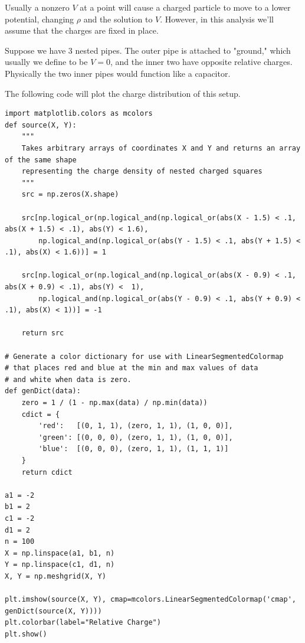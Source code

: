 Usually a nonzero $V$ at a point will cause a charged particle to move to a lower potential, changing $\rho$ and the solution to $V$.
However, in this analysis we'll assume that the charges are fixed in place.

Suppose we have 3 nested pipes.
The outer pipe is attached to "ground," which usually we define to be $V=0$, and the inner two have opposite relative charges.
Physically the two inner pipes would function like a capacitor.

The following code will plot the charge distribution of this setup.
\begin{lstlisting}
import matplotlib.colors as mcolors
def source(X, Y):
    """
    Takes arbitrary arrays of coordinates X and Y and returns an array of the same shape
    representing the charge density of nested charged squares
    """
    src = np.zeros(X.shape)

    src[np.logical_or(np.logical_and(np.logical_or(abs(X - 1.5) < .1, abs(X + 1.5) < .1), abs(Y) < 1.6),
        np.logical_and(np.logical_or(abs(Y - 1.5) < .1, abs(Y + 1.5) < .1), abs(X) < 1.6))] = 1
    
    src[np.logical_or(np.logical_and(np.logical_or(abs(X - 0.9) < .1, abs(X + 0.9) < .1), abs(Y) <  1),
        np.logical_and(np.logical_or(abs(Y - 0.9) < .1, abs(Y + 0.9) < .1), abs(X) < 1))] = -1

    return src
    
# Generate a color dictionary for use with LinearSegmentedColormap
# that places red and blue at the min and max values of data
# and white when data is zero.
def genDict(data):
    zero = 1 / (1 - np.max(data) / np.min(data))
    cdict = {
        'red':   [(0, 1, 1), (zero, 1, 1), (1, 0, 0)],
        'green': [(0, 0, 0), (zero, 1, 1), (1, 0, 0)],
        'blue':  [(0, 0, 0), (zero, 1, 1), (1, 1, 1)]
    }
    return cdict

a1 = -2
b1 = 2
c1 = -2
d1 = 2
n = 100
X = np.linspace(a1, b1, n)
Y = np.linspace(c1, d1, n)
X, Y = np.meshgrid(X, Y)

plt.imshow(source(X, Y), cmap=mcolors.LinearSegmentedColormap('cmap', genDict(source(X, Y))))
plt.colorbar(label="Relative Charge")
plt.show()
\end{lstlisting}


